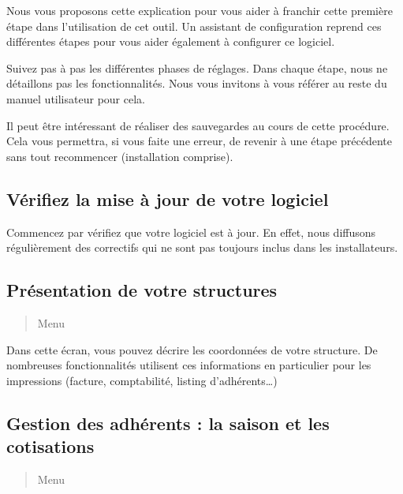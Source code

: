 \documentclass[a4paper,10pt,oneside,french]{sphinxmanual}
\begin{document}
\sphinxAtStartPar
Nous vous proposons cette explication pour vous aider à franchir cette première étape dans l’utilisation de cet outil.
Un assistant de configuration reprend ces différentes étapes pour vous aider également à configurer ce logiciel.

\sphinxAtStartPar
Suivez pas à pas les différentes phases de réglages. Dans chaque étape, nous ne détaillons pas les fonctionnalités.
Nous vous invitons à vous référer au reste du manuel utilisateur pour cela.

\sphinxAtStartPar
Il peut être intéressant de réaliser des sauvegardes au cours de cette procédure.
Cela vous permettra, si vous faite une erreur, de revenir à une étape précédente sans tout recommencer (installation comprise).


\subsection{Vérifiez la mise à jour de votre logiciel}
\label{\detokenize{asso/first_step:verifiez-la-mise-a-jour-de-votre-logiciel}}
\sphinxAtStartPar
Commencez par vérifiez que votre logiciel est à jour.
En effet, nous diffusons régulièrement des correctifs qui ne sont pas toujours inclus dans les installateurs.


\subsection{Présentation de votre structures}
\label{\detokenize{asso/first_step:presentation-de-votre-structures}}\begin{quote}

\sphinxAtStartPar
Menu 
\end{quote}

\sphinxAtStartPar
Dans cette écran, vous pouvez décrire les coordonnées de votre structure.
De nombreuses fonctionnalités utilisent ces informations en particulier pour les impressions (facture, comptabilité, listing d’adhérents…)


\subsection{Gestion des adhérents : la saison et les cotisations}
\label{\detokenize{asso/first_step:gestion-des-adherents-la-saison-et-les-cotisations}}\begin{quote}

\sphinxAtStartPar
Menu 
\end{quote}
\end{document}
